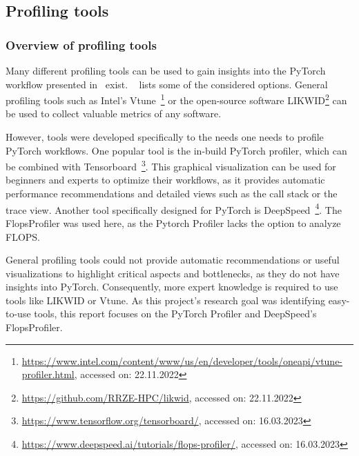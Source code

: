 \documentclass[12pt, a4paper, hidelinks]{article}
\begin{document}
\subsection{Profiling tools}

\subsubsection{Overview of profiling tools}
\label{sec:tools-overview}

Many different profiling tools can be used to gain insights into the PyTorch workflow presented in~ exist. 
~ lists some of the considered options.
General profiling tools such as Intel's Vtune~\footnote{\url{https://www.intel.com/content/www/us/en/developer/tools/oneapi/vtune-profiler.html}, accessed on: 22.11.2022} or the open-source software LIKWID\footnote{\url{https://github.com/RRZE-HPC/likwid}, accessed on: 22.11.2022} can be used to collect valuable metrics of any software.

However, tools were developed specifically to the needs one needs to profile PyTorch workflows.
One popular tool is the in-build PyTorch profiler, which can be combined with Tensorboard~\footnote{\url{https://www.tensorflow.org/tensorboard/}, accessed on: 16.03.2023}. This graphical visualization can be used for beginners and experts to optimize their workflows, as it provides automatic performance recommendations and detailed views such as the call stack or the trace view.
Another tool specifically designed for PyTorch is DeepSpeed~\footnote{\url{https://www.deepspeed.ai/tutorials/flops-profiler/}, accessed on: 16.03.2023}. The FlopsProfiler was used here, as the Pytorch Profiler lacks the option to analyze FLOPS.


General profiling tools could not provide automatic recommendations or useful visualizations to highlight critical aspects and bottlenecks, as they do not have insights into PyTorch. Consequently, more expert knowledge is required to use tools like LIKWID or Vtune.
As this project's research goal was identifying easy-to-use tools, this report focuses on the PyTorch Profiler and DeepSpeed's FlopsProfiler.
\end{document}
